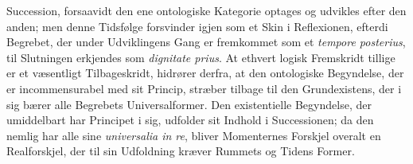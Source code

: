 \documentclass[12pt]{book}
\begin{document}
Succession, forsaavidt den ene ontologiske Kategorie optages og udvikles efter den anden; men
denne Tidsfølge forsvinder igjen som et Skin i Reflexionen, efterdi Begrebet, der under
Udviklingens Gang er fremkommet som et \textit{tempore posterius}, til Slutningen erkjendes som
\textit{dignitate prius}. At ethvert logisk Fremskridt tillige er et væsentligt Tilbageskridt,
hidrører derfra, at den ontologiske Begyndelse, der er incommensurabel med sit Princip, stræber
tilbage til den Grundexistens, der i sig bærer alle Begrebets Universalformer. Den
existentielle Begyndelse, der umiddelbart har Principet i sig, udfolder sit Indhold i
Successionen; da den nemlig har alle sine \textit{universalia in re}, bliver Momenternes
Forskjel overalt en Realforskjel, der til sin Udfoldning kræver Rummets og Tidens Former.
\end{document}

